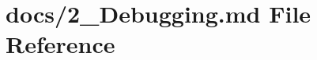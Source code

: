 \hypertarget{2___debugging_8md}{}\section{docs/2\+\_\+\+Debugging.md File Reference}
\label{2___debugging_8md}
